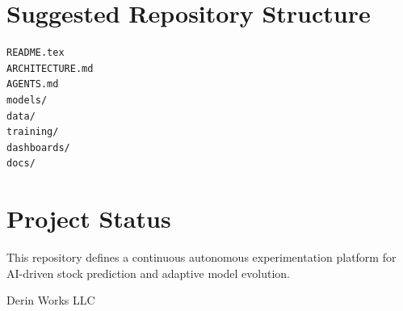 \documentclass[11pt]{article}
\begin{document}
\section*{Suggested Repository Structure}

\begin{verbatim}
README.tex
ARCHITECTURE.md
AGENTS.md
models/
data/
training/
dashboards/
docs/
\end{verbatim}

\section*{Project Status}

This repository defines a continuous autonomous experimentation platform for AI-driven stock prediction and adaptive model evolution.

\vfill
\begin{center}
\textcolor{accent}{Derin Works LLC}
\end{center}
\end{document}
